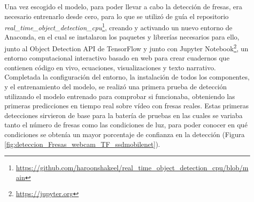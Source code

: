 Una vez escogido el modelo, para poder llevar a cabo la detección de fresas, era necesario entrenarlo desde cero, para lo que se utilizó de guía el repositorio \textit{real\_time\_object\_detection\_cpu}\footnote{\url{https://github.com/haroonshakeel/real_time_object_detection_cpu/blob/main}}, creando y activando un nuevo entorno de Anaconda, en el cual se instalaron los paquetes y librerías necesarios para ello, junto al Object Detection API de TensorFlow y junto con Jupyter Notebook\footnote{\url{https://jupyter.org}}, un entorno computacional interactivo basado en web para crear cuadernos que contienen código en vivo, ecuaciones, visualizaciones y texto narrativo. \\

Completada la configuración del entorno, la instalación de todos los componentes, y el entrenamiento del modelo, se realizó una primera prueba de detección utilizando el modelo entrenado para comprobar si funcionaba, obteniendo las primeras predicciones en tiempo real sobre vídeo con fresas reales. Estas primeras detecciones sirvieron de base para la batería de pruebas en las cuales se variaba tanto el número de fresas como las condiciones de luz, para poder conocer en qué condiciones se obtenía un mayor porcentaje de confianza en la detección (Figura \ref{fig:deteccion_Fresas_webcam_TF_ssdmobilenet}).
\pagebreak


